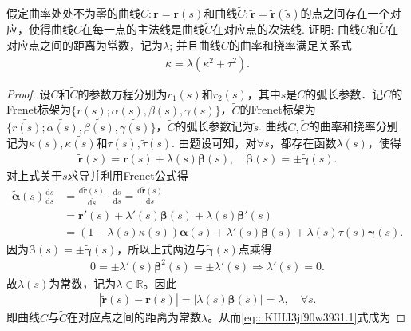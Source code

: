 \documentclass[../../main.tex]{subfiles}%
\begin{document}
\begin{example}
假定曲率处处不为零的曲线$C: \bm{r} = \bm{r}(s)$和曲线$\tilde{C}: \tilde{\bm{r}} = \tilde{\bm{r}}(\tilde{s})$的点之间存在一个对应，使得曲线$C$在每一点的主法线是曲线$\tilde{C}$在对应点的次法线. 证明: 曲线$C$和$\tilde{C}$在对应点之间的距离为常数，记为$\lambda$; 并且曲线$C$的曲率和挠率满足关系式
\begin{align*}
\kappa = \lambda(\kappa^2 + \tau^2).
\end{align*}
\end{example}
\begin{proof}
设$C$和$\tilde{C}$的参数方程分别为$r_1(s)$和$r_2(s)$，其中$s$是$C$的弧长参数．记$C$的Frenet标架为$\{r(s);\alpha(s),\beta(s),\gamma(s)\}$，$\tilde{C}$的Frenet标架为$\{\tilde{r(s)};\tilde{\alpha(s)},\tilde{\beta(s)},\tilde{\gamma(s)}\}$，$\tilde{C}$的弧长参数记为$\tilde{s}$.
曲线$C,\tilde{C}$的曲率和挠率分别记为$\kappa(s),\tilde{\kappa(s)}$和$\tau(s),\tilde{\tau}(s)$.
由题设可知，对$\forall s$，都存在函数$\lambda(s)$，使得
\begin{align*}
\tilde{\bm{r}}(s) = \bm{r}(s) + \lambda(s)\bm{\beta}(s),\quad \bm{\beta}(s) = \pm \tilde{\bm{\gamma}}(s).
\end{align*}
对上式关于$s$求导并利用\hyperref[theorem:微分几何-Frenet公式]{Frenet公式}得
\begin{align}
\tilde{\bm{\alpha}}(s) \frac{\mathrm{d}\tilde{s}}{\mathrm{d}s}
&= \frac{\mathrm{d}\tilde{\bm{r}}(s)}{\mathrm{d}\tilde{s}} \cdot \frac{\mathrm{d}\tilde{s}}{\mathrm{d}s}
= \frac{\mathrm{d}\tilde{\bm{r}}(s)}{\mathrm{d}s} \nonumber \\
&= \bm{r}'(s) + \lambda'(s)\bm{\beta}(s) + \lambda(s)\bm{\beta}'(s) \nonumber \\
&= \left( 1 - \lambda(s)\kappa(s) \right)\bm{\alpha}(s) + \lambda'(s)\bm{\beta}(s) + \lambda(s)\tau(s)\bm{\gamma}(s).
\label{eq:::KIHJ3jf90w3931.1}
\end{align}
因为$\bm{\beta}(s) = \pm \tilde{\bm{\gamma}}(s)$，所以上式两边与$\tilde{\bm{\gamma}}(s)$点乘得
\begin{align*}
0 = \pm \lambda'(s)\bm{\beta}^2(s) = \pm \lambda'(s) \Longrightarrow \lambda'(s) = 0.
\end{align*}
故$\lambda(s)$为常数，记为$\lambda \in \mathbb{R}$。因此
\begin{align*}
\left| \tilde{\bm{r}}(s) - \bm{r}(s) \right| = \left| \lambda(s)\bm{\beta}(s) \right| = \lambda,\quad \forall s.
\end{align*}
即曲线$C$与$\tilde{C}$在对应点之间的距离为常数$\lambda$。从而\eqref{eq:::KIHJ3jf90w3931.1}式成为

\end{proof}
\end{document}
